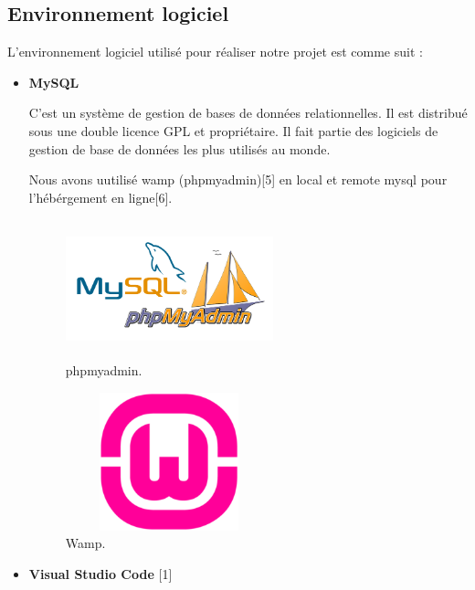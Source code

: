   \subsection{Environnement logiciel}


L'environnement logiciel utilis\'{e} pour r\'{e}aliser notre projet est comme suit : \newline

\begin{itemize}



\item {  \textbf{MySQL} }


C'est un syst\`{e}me de gestion de bases de données relationnelles. Il est distribu\'{e}
sous une double licence GPL et propri\'{e}taire. Il fait partie des logiciels de gestion
de base de donn\'{e}es les plus utilis\'{e}s au monde.

Nous avons uutilis\'{e} wamp (phpmyadmin)[5]  en local et remote mysql pour l'h\'{e}b\'{e}rgement en ligne[6]. \newline



\FloatBarrier
\begin{figure}[H]
\center
\includegraphics[width=6cm,height=4cm]{./figures/teklogos/phpmyadmin.png}
\caption{phpmyadmin.}
\end{figure}
\FloatBarrier

\FloatBarrier
\begin{figure}[H]
\center
\includegraphics[width=6cm,height=4cm]{./figures/teklogos/wamp.png}
\caption{Wamp.}
\end{figure}
\FloatBarrier

\item {  \textbf{Visual Studio Code} } [1]


\end{itemize}

